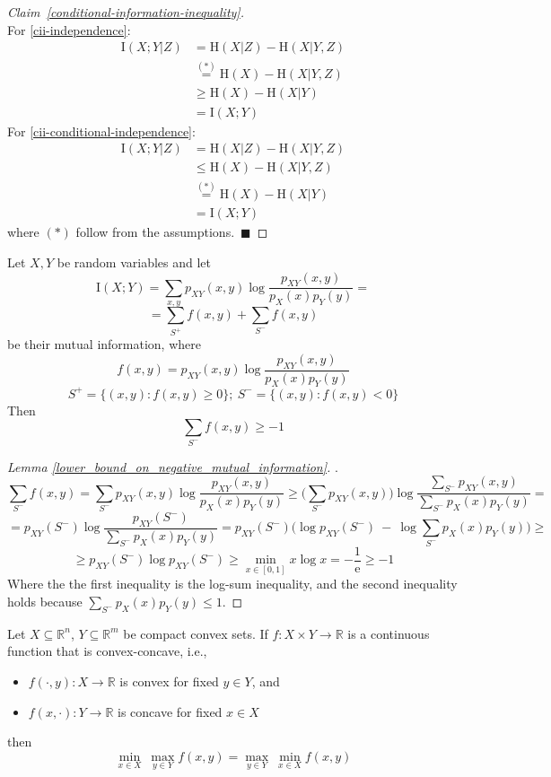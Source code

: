\documentclass[final,12pt]{colt2018}
\newcommand{\HH}{\mathrm{H}}
\newcommand{\mb}{\mathbb}
\newcommand{\II}[1]{\mathrm{I}\left(#1\right)}
\begin{document}
\begin{proof}[Claim~\ref{conditional-information-inequality}]\\
 	For \ref{cii-independence}:
 	\begin{align*}
 	\II{X;Y|Z} & = \HH(X|Z) - \HH(X|Y,Z) \\
 	& \stackrel{(*)}{=} \HH(X) - \HH(X|Y,Z) \\
 	& \geq \HH(X) - \HH(X|Y) \\ 
 	& = \II{X;Y}
 	\end{align*}
 	For \ref{cii-conditional-independence}:
 	\begin{align*}
 	\II{X;Y|Z} & = \HH(X|Z) - \HH(X|Y,Z) \\
 	& \leq \HH(X) - \HH(X|Y,Z) \\
 	& \stackrel{(*)}{=} \HH(X) - \HH(X|Y) \\ 
 	& = \II{X;Y}
 	\end{align*}
 	where $(*)$ follow from the assumptions.~$\blacksquare$
\end{proof}
 
\begin{lemma}\label{lower_bound_on_negative_mutual_information}
	Let $X,Y$ be random variables and let
	\[
	\II{X;Y} = \sum_{x,y} p_{XY}(x, y) \log \frac{p_{XY}(x, y)}{p_{X}(x)p_{Y}(y)} = 
	\]
	\[
	=\sum_{S^+} f(x,y) + \sum_{S^-} f(x,y)
	\]
	be their mutual information, where
	\[
	f(x,y) = p_{XY}(x, y) \log \frac{p_{XY}(x, y)}{p_{X}(x)p_{Y}(y)}
	\]
	\[
	S^+ = \{(x,y): f(x,y) \geq 0\};\	S^- = \{(x,y): f(x,y) < 0\}
	\]
	Then 
	\[
	\sum_{S^-} f(x,y) \geq -1
	\]
\end{lemma}

\begin{proof}[Lemma \ref{lower_bound_on_negative_mutual_information}].
\[
\sum_{S^-} f(x,y) = \sum_{S^-} p_{XY}(x, y) \log \frac{p_{XY}(x, y)}{p_{X}(x)p_{Y}(y)} \geq \Bigg(\sum_{S^-} p_{XY}(x, y)\Bigg) \log \frac{\sum_{S^-} p_{XY}(x, y)}{\sum_{S^-} p_{X}(x)p_{Y}(y)} =
\]
\[
= p_{XY}(S^-) \log \frac{p_{XY}(S^-)}{\sum_{S^-} p_{X}(x)p_{Y}(y)} = p_{XY}(S^-) \Bigg( \log p_{XY}(S^-)\ -\ \log \sum_{S^-} p_{X}(x)p_{Y}(y)\Bigg) \geq 
\]
\[
\geq p_{XY}(S^-) \log p_{XY}(S^-) \geq \min_{x\in[0,1]} x \log x = -\frac{1}{\mathrm{e}} \geq -1
\]
Where the the first inequality is the log-sum inequality, and the second inequality holds because $\sum_{S^-} p_{X}(x)p_{Y}(y) \leq 1$.
\end{proof}

\begin{theorem}\label{von-neumann-minimax}
	Let $X\subseteq \mb{R}^n$, $Y \subseteq \mb{R}^m$ be compact convex sets. If $f:X\times Y \rightarrow \mb{R}$ is a continuous function that is convex-concave, i.e., 
	\begin{itemize}
		\item{$f(\cdot, y):X\rightarrow\mb{R}$ is convex for fixed $y\in Y$, and }
		\item{$f(x, \cdot):Y\rightarrow\mb{R}$ is concave for fixed $x\in X$}
	\end{itemize}
	then
	\[
	\min_{x \in X} \: \max_{y \in Y} f(x,y) = \max_{y \in Y} \: \min_{x \in X} f(x,y)
	\]
\end{theorem}
\end{document}
